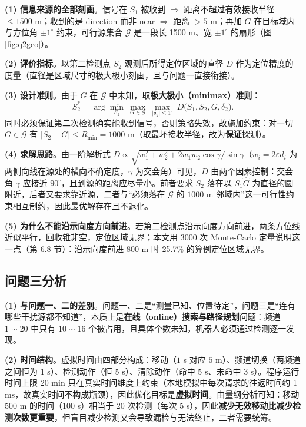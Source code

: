 \documentclass{cumcmthesis}
\begin{document}
\textbf{(1) 信息来源的全部刻画}。信号在 $S_1$ 被收到 $\Rightarrow$ 距离不超过有效接收半径 $\le1500$ m；收到的是 direction 而非 near $\Rightarrow$ 距离 $>5$ m；再加 $G$ 在目标域内与方位角 $\pm1^{\circ}$ 约束，可行源集合 $\mathcal{G}$ 是一段长 1500 m、宽 $\pm1^{\circ}$ 的扇形（图 \ref{fig:q2geo}）。

\textbf{(2) 评价指标}。以第二检测点 $S_2$ 观测后所得定位区域的直径 $D$ 作为定位精度的度量（直径是区域尺寸的极大极小刻画，且与问题一直接衔接）。

\textbf{(3) 设计准则}。由于 $G$ 在 $\mathcal{G}$ 中未知，取\textbf{极大极小（minimax）准则}：
\begin{equation}
S_2^{*}=\arg\min_{S_2}\ \max_{G\in\mathcal{G}}\ \max_{|\delta_2|\le1^{\circ}}\ D\bigl(S_1,S_2,G,\delta_2\bigr).
\label{eq:q2minimax}
\end{equation}
同时必须保证第二次检测确实能收到信号，否则策略失效，故施加约束：对一切 $G\in\mathcal{G}$ 有 $|S_2-G|\le R_{\min}=1000$ m（取最坏接收半径，故为\textbf{保证}探测）。

\textbf{(4) 求解思路}。由一阶解析式 $D\propto\sqrt{w_1^2+w_2^2+2w_1w_2\cos\gamma}/\sin\gamma$（$w_i=2\varepsilon d_i$ 为两侧向线在源处的横向不确定度，$\gamma$ 为交会角）可见，$D$ 由两个因素控制：交会角 $\gamma$ 应接近 $90^{\circ}$，且到源的距离应尽量小。前者要求 $S_2$ 落在以 $S_1\widehat{G}$ 为直径的圆附近，后者又要求靠近源，二者与“必须落在 $\mathcal{G}$ 的 $1000$ m 邻域内”这一可行性约束相互制约，因此最优解存在且不退化。

\textbf{(5) 为什么不能沿示向度方向前进}。若第二检测点沿示向度方向前进，两条方位线近似平行，回收锥非空，定位区域无界；本文用 3000 次 Monte-Carlo 定量说明这一点（第 6.8 节）：沿示向度前进 800 m 时 25.7\% 的算例定位区域无界。

\subsection{问题三分析}

\textbf{(1) 与问题一、二的差别}。问题一、二是“测量已知、位置待定”，问题三是“连有哪些干扰源都不知道”，本质上是\textbf{在线（online）搜索与路径规划}问题：频道 $1\sim20$ 中只有 $10\sim16$ 个被占用，且具体个数未知，机器人必须通过检测逐一发现。

\textbf{(2) 时间结构}。虚拟时间由四部分构成：移动（$1$ s 对应 $5$ m）、频道切换（两频道之间恒为 1 s）、检测动作（恒 5 s）、清除动作（命中 5 s、未命中 3 s）。程序运行时间上限 20 min 只在真实时间维度上约束（本地模拟中每次请求的往返时间约 1 ms，故真实时间不构成瓶颈），因此优化目标是\textbf{虚拟时间}。由量纲分析可知：移动 500 m 的时间（100 s）相当于 20 次检测（每次 5 s），因此\textbf{减少无效移动比减少检测次数更重要}，但盲目减少检测又会导致漏检与无法终止，二者需要统筹。
\end{document}
